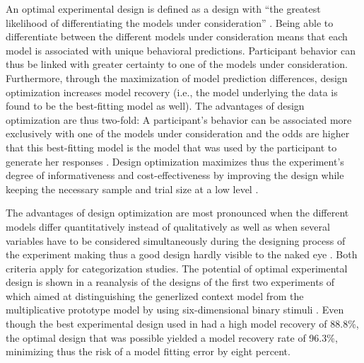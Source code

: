\documentclass[a4paper,man,natbib]{apa6}
\begin{document}
An optimal experimental design is defined as a design with ``the greatest likelihood of differentiating the models under consideration'' \cite[][p. 500]{myung2009optimal}. Being able to differentiate between the different models under consideration means that each model is associated with unique behavioral predictions. Participant behavior can thus be linked with greater certainty to one of the models under consideration. Furthermore, through the maximization of model prediction differences, design optimization increases model recovery (i.e., the model underlying the data is found to be the best-fitting model as well). The advantages of design optimization are thus two-fold: A participant's behavior can be associated more exclusively with one of the models under consideration and the odds are higher that this best-fitting model is the model that was used by the participant to generate her responses \citep[albeit that each scientific model is only an approximation of the participant's cognitive model; see][]{myung2009optimal}. Design optimization maximizes thus the experiment's degree of informativeness and cost-effectiveness by improving the design while keeping the necessary sample and trial size at a low level \citep{cavagnaro2009better, ouyang2016practical, raffert2012optimally, atkinson2007optimum, nelson2005finding}. 

The advantages of design optimization are most pronounced when the different models differ quantitatively instead of qualitatively as well as when several variables have to be considered simultaneously during the designing process of the experiment making thus a good design hardly visible to the naked eye \citep{myung2009optimal}. Both criteria apply for categorization studies.
The potential of optimal experimental design is shown in a reanalysis of the designs of the first two experiments of \cite{smith1998prototypes} which aimed at distinguishing the generlized context model \citep{nosofsky1986attention} from the multiplicative prototype model \citep{smith1998prototypes} by using six-dimensional binary stimuli \citep{myung2009optimal}. Even though the best experimental design used in \cite{smith1998prototypes} had a high model recovery of 88.8\%, the optimal design that was possible yielded a model recovery rate of 96.3\%, minimizing thus the risk of a model fitting error by eight percent.  
\end{document}
